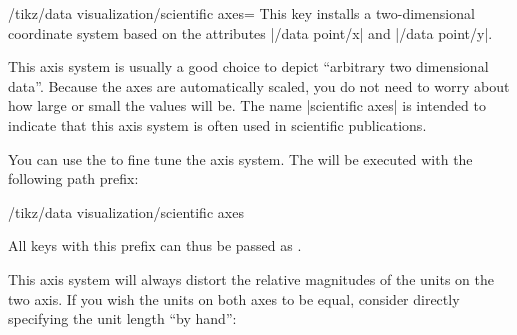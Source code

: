 \begin{key}{/tikz/data visualization/scientific axes=}
    This key installs a two-dimensional coordinate system based on the
    attributes |/data point/x| and |/data point/y|.
\begin{codeexample}[width=7cm]
\end{codeexample}

    This axis system is usually a good choice to depict ``arbitrary two
    dimensional data''. Because the axes are automatically scaled, you do not
    need to worry about how large or small the values will be. The name
    |scientific axes| is intended to indicate that this axis system is often
    used in scientific publications.

    You can use the  to fine tune the axis system. The
     will be executed with the following path prefix:
\begin{codeexample}
/tikz/data visualization/scientific axes
\end{codeexample}
    All keys with this prefix can thus be passed as .

    This axis system will always distort the relative magnitudes of the units
    on the two axis. If you wish the units on both axes to be equal, consider
    directly specifying the unit length ``by hand'':
\begin{codeexample}[]
\end{codeexample}


\end{key}
